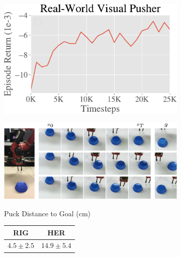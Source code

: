 \documentclass{article}
\begin{document}
\begin{figure}
    \centering
    \begin{subfigure}[b]{0.28\textwidth}
        \includegraphics[width=1\linewidth]{img/pusher_learning_curve-crop.pdf}
    \end{subfigure}
    \begin{subfigure}[b]{0.4\textwidth}
        \includegraphics[width=1\linewidth]{img/real_pusher_rollouts.pdf}
    \end{subfigure}
    \begin{subfigure}[b]{0.3\textwidth}
        \begin{flushright}
            Puck Distance to Goal (cm) \\
            \vspace{0.1cm}           
            {\renewcommand{\arraystretch}{1.2}%
            \begin{tabular}{  c | c }
             \hline
                RIG & HER  \\ \hline
                $\mathbf{4.5 \pm 2.5}$ & $14.9 \pm 5.4$  \\
            \end{tabular}
            }
        \end{flushright}

\end{subfigure}
\end{figure}
\end{document}
